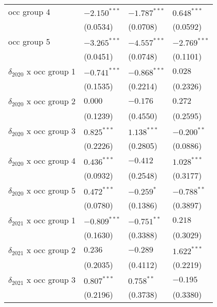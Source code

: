 \begin{tabular}{llll}
occ group 4                            &  $-2.150^{***}$ &  $-1.787^{***}$ &   $0.648^{***}$ \\
                                       &        (0.0534) &        (0.0708) &        (0.0592) \\
occ group 5                            &  $-3.265^{***}$ &  $-4.557^{***}$ &  $-2.769^{***}$ \\
                                       &        (0.0451) &        (0.0748) &        (0.1101) \\
$\delta_{2020}$ x occ group 1          &  $-0.741^{***}$ &  $-0.868^{***}$ &         $0.028$ \\
                                       &        (0.1535) &        (0.2214) &        (0.2326) \\
$\delta_{2020}$ x occ group 2          &         $0.000$ &        $-0.176$ &         $0.272$ \\
                                       &        (0.1239) &        (0.4550) &        (0.2595) \\
$\delta_{2020}$ x occ group 3          &   $0.825^{***}$ &   $1.138^{***}$ &   $-0.200^{**}$ \\
                                       &        (0.2226) &        (0.2805) &        (0.0886) \\
$\delta_{2020}$ x occ group 4          &   $0.436^{***}$ &        $-0.412$ &   $1.028^{***}$ \\
                                       &        (0.0932) &        (0.2548) &        (0.3177) \\
$\delta_{2020}$ x occ group 5          &   $0.472^{***}$ &      $-0.259^*$ &   $-0.788^{**}$ \\
                                       &        (0.0780) &        (0.1386) &        (0.3897) \\
$\delta_{2021}$ x occ group 1          &  $-0.809^{***}$ &   $-0.751^{**}$ &         $0.218$ \\
                                       &        (0.1630) &        (0.3388) &        (0.3029) \\
$\delta_{2021}$ x occ group 2          &         $0.236$ &        $-0.289$ &   $1.622^{***}$ \\
                                       &        (0.2035) &        (0.4112) &        (0.2219) \\
$\delta_{2021}$ x occ group 3          &   $0.807^{***}$ &    $0.758^{**}$ &        $-0.195$ \\
                                       &        (0.2196) &        (0.3738) &        (0.3380) \\

\end{tabular}
